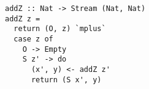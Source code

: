 \begin{figure}[!t]
  \centering
  \begin{minipage}{\columnwidth}
    \begin{lstlisting}[label={add_z}, caption={Function for \lstinline{addo out out in} direction}, captionpos=b, frame=tb]
addZ :: Nat -> Stream (Nat, Nat)
addZ z =
  return (O, z) `mplus`
  case z of
    O -> Empty
    S z' -> do
      (x', y) <- addZ z'
      return (S x', y)
    \end{lstlisting}
  \end{minipage}
\end{figure}